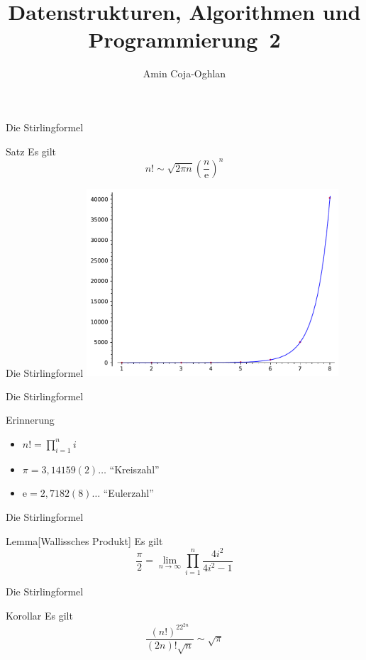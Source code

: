 \documentclass[aspectratio=1610, 11pt]{beamer}
\title{Datenstrukturen, Algorithmen und Programmierung~2}
\author[A.~Coja-Oghlan]{Amin Coja-Oghlan}
\institute[DAP2]{Lehrstuhl Informatik 2\\Fakult\"at f\"ur Informatik}
\newcommand\eul{\mathrm e}
\newcommand\bc[1]{\left({#1}\right)}
\newcommand\bcfr[2]{\bc{\frac{#1}{#2}}}
\begin{document}
\maketitle

\begin{frame}{Die Stirlingformel}
	\begin{block}{Satz}
		Es gilt $$n!\sim\sqrt{2\pi n}\bcfr n\eul^n$$
	\end{block}
\end{frame}

\begin{frame}{Die Stirlingformel}
	\hfill\includegraphics[height=70mm]{./images/stirling.pdf}
\end{frame}

\begin{frame}{Die Stirlingformel}
	\begin{exampleblock}{Erinnerung}
		\begin{itemize}
			\item $n!=\prod_{i=1}^ni$
			\item $\pi=3,14159(2)\ldots$ ``Kreiszahl''
			\item $\eul=2,7182(8)\ldots$ ``Eulerzahl''
		\end{itemize}
	\end{exampleblock}
\end{frame}

\begin{frame}{Die Stirlingformel}
	\begin{block}{Lemma\hfill[Wallissches Produkt]}
		Es gilt $$\frac\pi2=\lim_{n\to\infty}\prod_{i=1}^n\frac{4i^2}{4i^2-1}$$
	\end{block}
\end{frame}

\begin{frame}{Die Stirlingformel}
	\begin{block}{Korollar}
		Es gilt
	$$\frac{(n!)^22^{2n}}{(2n)!\sqrt n}\sim\sqrt\pi$$
	\end{block}
\end{frame}
\end{document}
